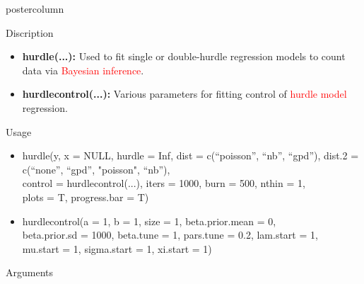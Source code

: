 \documentclass[final]{beamer}\usepackage[]{graphicx}\usepackage[]{color}
\newcommand{\red}{\textcolor{red}}
\begin{document}
{\begin{frame}
\begin{columns}
\begin{column}{.33\textwidth}
\begin{beamercolorbox}[center,wd=\textwidth]{postercolumn}
\begin{minipage}[T]{.97\textwidth}
{\begin{block}{Discription}
\begin{itemize}
	\item \textbf{hurdle(...):} Used to fit single or double-hurdle regression models to count data via \red{Bayesian inference}.
	\begin{center}
		\vspace{-0.5cm}
	\end{center}
	\item \textbf{hurdle\textunderscore control(...):} Various parameters for fitting control of \red{hurdle model} regression.
\end{itemize}
	\vspace{-0.25cm}
	
\end{block}
\vfill


\begin{block}{Usage}

\begin{itemize}
	\item hurdle(y, x = NULL, hurdle = Inf,
	dist = c(``poisson'', ``nb'', ``gpd''),
	dist.2 = c(``none'', ``gpd'', "poisson", ``nb''),\\
	control = hurdle\textunderscore control(...),
	iters = 1000, burn = 500, nthin = 1,
	\\plots = T, progress.bar = T)
\begin{center}
	\vspace{-0.5cm}
\end{center}
	\item hurdle\textunderscore control(a = 1, b = 1, size = 1, beta.prior.mean = 0, \\beta.prior.sd = 1000, beta.tune = 1, pars.tune = 0.2,
	lam.start = 1, \\mu.start = 1,
	sigma.start = 1, xi.start = 1)
\end{itemize}
\vspace{-0.25cm}

\end{block}
\vfill

\begin{block}{Arguments}



\end{block}}
\end{minipage}
\end{beamercolorbox}
\end{column}
\end{columns}
\end{frame}}
\end{document}
